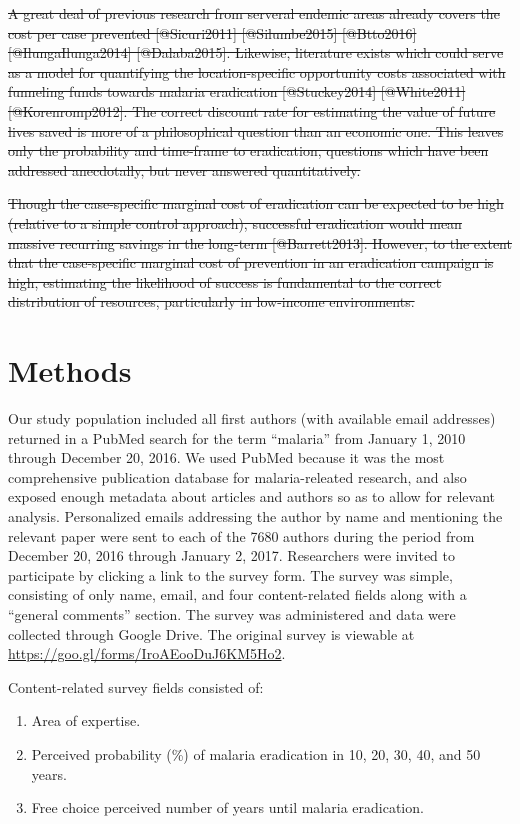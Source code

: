 \documentclass[]{article}
\providecommand{\tightlist}{%
  \setlength{\itemsep}{0pt}\setlength{\parskip}{0pt}}
\begin{document}
\st{A great deal of previous research from serveral endemic areas already covers the cost per case prevented [@Sicuri2011] [@Silumbe2015] [@Btto2016] [@IlungaIlunga2014] [@Dalaba2015]. Likewise, literature exists which could serve as a model for quantifying the location-specific opportunity costs associated with funneling funds towards malaria eradication [@Stuckey2014] [@White2011] [@Korenromp2012]. The correct discount rate for estimating the value of future lives saved is more of a philosophical question than an economic one. This leaves only the probability and time-frame to eradication, questions which have been addressed anecdotally, but never answered quantitatively.}

\st{Though the case-specific marginal cost of eradication can be expected to be high (relative to a simple control approach), successful eradication would mean massive recurring savings in the long-term [@Barrett2013]. However, to the extent that the case-specific marginal cost of prevention in an eradication campaign is high, estimating the likelihood of success is fundamental to the correct distribution of resources, particularly in low-income environments. }

\section{Methods}\label{methods}

Our study population included all first authors (with available email
addresses) returned in a PubMed search for the term ``malaria'' from
January 1, 2010 through December 20, 2016. We used PubMed because it was
the most comprehensive publication database for malaria-releated
research, and also exposed enough metadata about articles and authors so
as to allow for relevant analysis. Personalized emails addressing the
author by name and mentioning the relevant paper were sent to each of
the 7680 authors during the period from December 20, 2016 through
January 2, 2017. Researchers were invited to participate by clicking a
link to the survey form. The survey was simple, consisting of only name,
email, and four content-related fields along with a ``general comments''
section. The survey was administered and data were collected through
Google Drive. The original survey is viewable at
\url{https://goo.gl/forms/IroAEooDuJ6KM5Ho2}.

Content-related survey fields consisted of:

\begin{enumerate}
\def\labelenumi{\arabic{enumi}.}
\tightlist
\item
  Area of expertise.
\item
  Perceived probability (\%) of malaria eradication in 10, 20, 30, 40,
  and 50 years.
\item
  Free choice perceived number of years until malaria eradication.
\end{enumerate}
\end{document}
